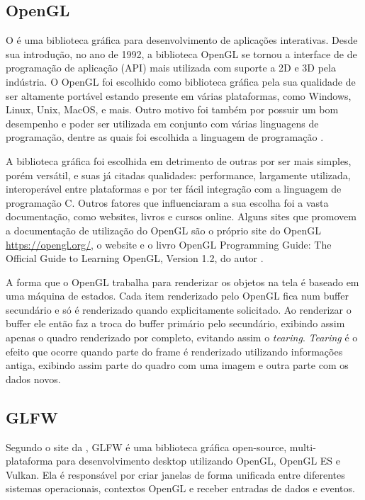 \documentclass[12pt, %
openright,
oneside, %
a4paper,    %
brazil]{facom-ufu-abntex2}
\begin{document}
\subsection{OpenGL}
O  é uma biblioteca gráfica para desenvolvimento de aplicações interativas. Desde sua introdução, no ano de 1992, a biblioteca OpenGL se tornou  a interface de de programação de aplicação (API) mais utilizada com suporte a 2D e 3D pela indústria. O OpenGL foi escolhido como biblioteca gráfica pela sua qualidade de ser altamente portável estando presente em várias plataformas, como Windows, Linux, Unix, MacOS, e mais. Outro motivo foi também por possuir um bom desempenho e poder ser utilizada em conjunto com várias linguagens de programação, dentre as quais foi escolhida a linguagem de programação .

A biblioteca gráfica  foi escolhida em detrimento de outras por ser mais simples, porém versátil, e suas já citadas qualidades: performance, largamente utilizada, interoperável entre plataformas e por ter fácil integração com a linguagem de programação C. Outros fatores que influenciaram a sua escolha foi a vasta documentação, como websites, livros e cursos online. Alguns sites que promovem a documentação de utilização do OpenGL são o próprio site do OpenGL \hyperref[https://opengl.org/]{https://opengl.org/}, o website  e o livro OpenGL Programming Guide: The Official Guide to Learning OpenGL, Version 1.2, do autor .

A forma que o OpenGL trabalha para renderizar os objetos na tela é baseado em uma máquina de estados. Cada item renderizado pelo OpenGL fica num buffer secundário e só é renderizado quando explicitamente solicitado. Ao renderizar o buffer ele então faz a troca do buffer primário pelo secundário, exibindo assim apenas o quadro renderizado por completo, evitando assim o \textit{tearing}. \textit{Tearing} é o efeito que ocorre quando parte do frame é renderizado utilizando informações antiga, exibindo assim parte do quadro com uma imagem e outra parte com os dados novos.

\subsection{GLFW}
Segundo o site da , GLFW é uma biblioteca gráfica open-source, multi-plataforma para desenvolvimento desktop utilizando OpenGL, OpenGL ES e Vulkan. Ela é responsável por criar janelas de forma unificada entre diferentes sistemas operacionais, contextos OpenGL e receber entradas de dados e eventos.
\end{document}
